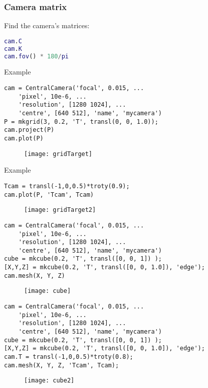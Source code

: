 \begin{frame}[fragile]
\frametitle{Camera matrix}
Find the camera's matrices:
\begin{lstlisting}[language=Matlab]
cam.C
cam.K
cam.fov() * 180/pi
\end{lstlisting}
\end{frame}

\begin{frame}[fragile]
Example
\begin{lstlisting}
cam = CentralCamera('focal', 0.015, ...
    'pixel', 10e-6, ... 
    'resolution', [1280 1024], ...
    'centre', [640 512], 'name', 'mycamera')
P = mkgrid(3, 0.2, 'T', transl(0, 0, 1.0));
cam.project(P)
cam.plot(P)
\end{lstlisting}
\begin{figure}[!h]
\centering
\texttt{[image: gridTarget]}
\end{figure}
\end{frame}

\begin{frame}[fragile]
Example
\begin{lstlisting}
Tcam = transl(-1,0,0.5)*troty(0.9);
cam.plot(P, 'Tcam', Tcam)
\end{lstlisting}
\begin{figure}[!h]
\centering
\texttt{[image: gridTarget2]}
\end{figure}
\end{frame}

\begin{frame}[fragile]
\begin{lstlisting}
cam = CentralCamera('focal', 0.015, ...
    'pixel', 10e-6, ... 
    'resolution', [1280 1024], ...
    'centre', [640 512], 'name', 'mycamera')
cube = mkcube(0.2, 'T', transl([0, 0, 1]) );
[X,Y,Z] = mkcube(0.2, 'T', transl([0, 0, 1.0]), 'edge');
cam.mesh(X, Y, Z)
\end{lstlisting}
\begin{figure}[!h]
\centering
\texttt{[image: cube]}
\end{figure}
\end{frame}

\begin{frame}[fragile]
\begin{lstlisting}
cam = CentralCamera('focal', 0.015, ...
    'pixel', 10e-6, ... 
    'resolution', [1280 1024], ...
    'centre', [640 512], 'name', 'mycamera')
cube = mkcube(0.2, 'T', transl([0, 0, 1]) );
[X,Y,Z] = mkcube(0.2, 'T', transl([0, 0, 1.0]), 'edge');
cam.T = transl(-1,0,0.5)*troty(0.8);
cam.mesh(X, Y, Z, 'Tcam', Tcam);
\end{lstlisting}
\begin{figure}[!h]
\centering
\texttt{[image: cube2]}
\end{figure}
\end{frame}

